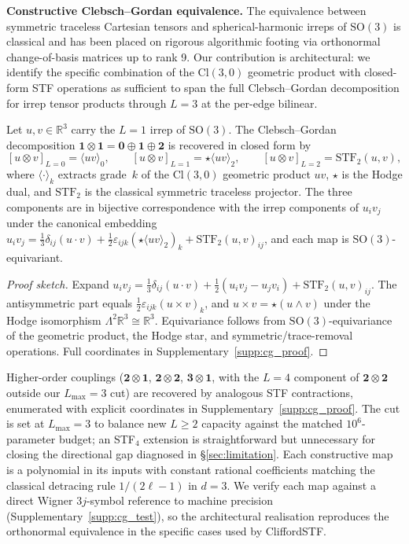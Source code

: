 \textbf{Constructive Clebsch--Gordan equivalence.} The equivalence between symmetric traceless Cartesian tensors and spherical-harmonic irreps of $\mathrm{SO}(3)$ is classical and has been placed on rigorous algorithmic footing via orthonormal change-of-basis matrices up to rank 9. Our contribution is architectural: we identify the specific combination of the $\mathrm{Cl}(3,0)$ geometric product with closed-form STF operations as sufficient to span the full Clebsch--Gordan decomposition for irrep tensor products through $L{=}3$ at the per-edge bilinear.

\begin{theorem}\label{thm:cg_completeness}
Let $u, v \in \mathbb{R}^3$ carry the $L{=}1$ irrep of $\mathrm{SO}(3)$. The Clebsch--Gordan decomposition $\mathbf{1} \otimes \mathbf{1} = \mathbf{0} \oplus \mathbf{1} \oplus \mathbf{2}$ is recovered in closed form by
\[
[u \otimes v]_{L=0} = \langle uv \rangle_0, \qquad
[u \otimes v]_{L=1} = \star\langle uv \rangle_2, \qquad
[u \otimes v]_{L=2} = \mathrm{STF}_2(u,v),
\]
where $\langle \cdot \rangle_k$ extracts grade~$k$ of the $\mathrm{Cl}(3,0)$ geometric product $uv$, $\star$ is the Hodge dual, and $\mathrm{STF}_2$ is the classical symmetric traceless projector. The three components are in bijective correspondence with the irrep components of $u_iv_j$ under the canonical embedding $u_iv_j = \tfrac{1}{3}\delta_{ij}(u\cdot v) + \tfrac{1}{2}\varepsilon_{ijk}(\star\langle uv \rangle_2)_k + \mathrm{STF}_2(u,v)_{ij}$, and each map is $\mathrm{SO}(3)$-equivariant.
\end{theorem}

\begin{proof}[Proof sketch]
Expand $u_iv_j = \tfrac{1}{3}\delta_{ij}(u\cdot v) + \tfrac{1}{2}(u_iv_j - u_jv_i) + \mathrm{STF}_2(u,v)_{ij}$. The antisymmetric part equals $\tfrac{1}{2}\varepsilon_{ijk}(u\times v)_k$, and $u\times v = \star(u\wedge v)$ under the Hodge isomorphism $\Lambda^2\mathbb{R}^3 \cong \mathbb{R}^3$. Equivariance follows from $\mathrm{SO}(3)$-equivariance of the geometric product, the Hodge star, and symmetric/trace-removal operations. Full coordinates in Supplementary~\ref{supp:cg_proof}.
\end{proof}

Higher-order couplings ($\mathbf{2}\otimes\mathbf{1}$, $\mathbf{2}\otimes\mathbf{2}$, $\mathbf{3}\otimes\mathbf{1}$, with the $L{=}4$ component of $\mathbf{2}\otimes\mathbf{2}$ outside our $L_{\max}{=}3$ cut) are recovered by analogous STF contractions, enumerated with explicit coordinates in Supplementary~\ref{supp:cg_proof}. The cut is set at $L_{\max}{=}3$ to balance new $L{\geq}2$ capacity against the matched $10^6$-parameter budget; an STF$_4$ extension is straightforward but unnecessary for closing the directional gap diagnosed in \S\ref{sec:limitation}. Each constructive map is a polynomial in its inputs with constant rational coefficients matching the classical detracing rule $1/(2\ell-1)$ in $d=3$. We verify each map against a direct Wigner $3j$-symbol reference to machine precision (Supplementary~\ref{supp:cg_test}), so the architectural realisation reproduces the orthonormal equivalence in the specific cases used by CliffordSTF.

